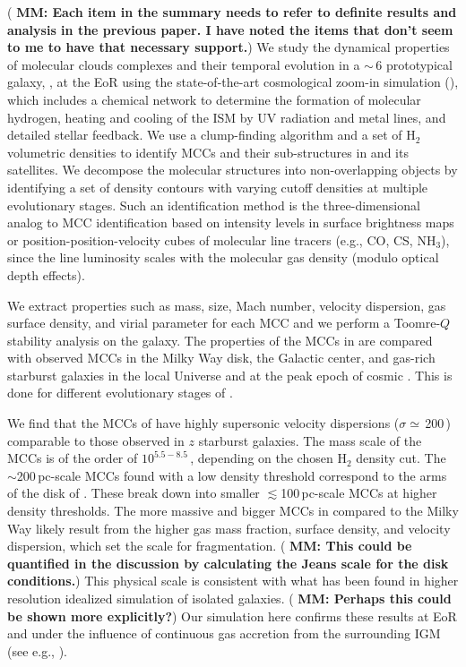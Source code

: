 \IfFileExists{emulateapjlegacy.cls}{\documentclass[iop]{emulateapjlegacy}}{\documentclass[iop]{emulateapj}}
\newcommand{\MM}[1]{({\bf \color{mmcolor} MM: #1})}
\begin{document}
\MM{Each item in the summary needs to refer to definite results and
  analysis in the previous paper.  I have noted the items that don't
  seem to me to have that necessary support.}
We study the dynamical properties of molecular clouds complexes and their temporal evolution in a \z$\sim$\,6 prototypical galaxy, \flower,
at the EoR using the state-of-the-art cosmological zoom-in simulation (),
which includes a chemical network to determine the formation of molecular
hydrogen, heating and cooling of the ISM by
    UV radiation and metal lines, 
and detailed stellar feedback.
We use a clump-finding algorithm and a set of H$_2$ volumetric densities
to identify MCCs and their sub-structures in \flower and its satellites.
We decompose the molecular structures into non-overlapping 
     objects
by identifying a set of 
     density contours with varying cutoff densities at multiple
evolutionary stages.
Such an identification method is 
     the three-dimensional analog
to MCC identification based on 
    intensity levels in surface brightness maps or
    position-position-velocity cubes
of molecular line tracers (e.g., CO, CS, NH$_3$),
since the line luminosity scales with the molecular gas density (modulo optical depth effects).

We extract properties such as mass, size, Mach number, velocity
dispersion, gas surface density, and virial parameter for each MCC and
we perform a Toomre-$Q$ stability analysis
    on the galaxy. 
The properties of the MCCs in \flower are compared with observed MCCs in the Milky Way disk, the Galactic center, and gas-rich starburst galaxies in the local Universe and at the peak epoch of cosmic \SF. This is done for different evolutionary stages of \flower.

We find that the MCCs of \flower 
   have highly supersonic
velocity dispersions ($\sigma\simeq$\,200\,\kms) comparable to
those observed in $z$ starburst galaxies.
The mass scale of the MCCs is of the order of $10^{5.5-8.5}$\,\Msun,
depending on the chosen H$_{2}$ density cut. 
The $\sim$200\,pc-scale MCCs found with a low density threshold
correspond to the arms of the disk of \flower. These break down into smaller $\lesssim$100\,pc-scale MCCs at higher density thresholds.
The more massive and bigger MCCs in \flower compared to the Milky Way
likely result from the higher gas mass fraction, surface density, and velocity dispersion,
which set the scale for fragmentation. \MM{This could be quantified in
  the discussion by calculating the Jeans scale for the disk conditions.}
This physical scale is
consistent with what has been found in higher resolution idealized
simulation of isolated galaxies. \MM{Perhaps this could be shown more explicitly?}
Our simulation here confirms these results at EoR and under
the influence of continuous gas accretion from the surrounding IGM (see e.g., \citealt{Klessen10a, Goldbaum11a}).
\end{document}
